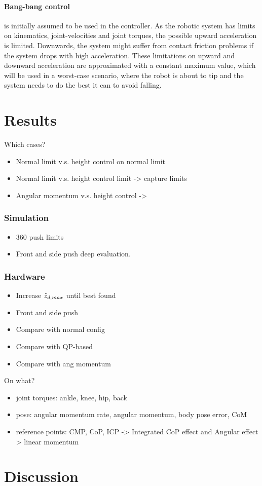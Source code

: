 \paragraph{Bang-bang control}  is initially assumed to be used in the controller. As the robotic system has limits on kinematics, joint-velocities and joint torques, the possible upward acceleration is limited. Downwards, the system might suffer from contact friction problems if the system drops with high acceleration. These limitations on upward and downward acceleration are approximated with a constant maximum value, which will be used in a worst-case scenario, where the robot is about to tip and the system needs to do the best it can to avoid falling.

\section{Results}
Which cases?
\begin{itemize}
	\item Normal limit v.s. height control on normal limit
	\item Normal limit v.s. height control limit -> capture limits
	\item Angular momentum v.s. height control -> 
\end{itemize}
\subsubsection{Simulation}
\begin{itemize}
	\item 360 push limits
	\item Front and side push deep evaluation.
\end{itemize}
\subsubsection{Hardware}
\begin{itemize}
	\item Increase $\ddot{z}_{d,max}$ until best found
	\item Front and side push
	\item Compare with normal config
	\item Compare with QP-based
	\item Compare with ang momentum
\end{itemize}
On what?
\begin{itemize}
	\item joint torques: ankle, knee, hip, back
	\item pose: angular momentum rate, angular momentum, body pose error, CoM
	\item reference points: CMP, CoP, ICP -> Integrated CoP effect and Angular effect > linear momentum
\end{itemize}

\section{Discussion}